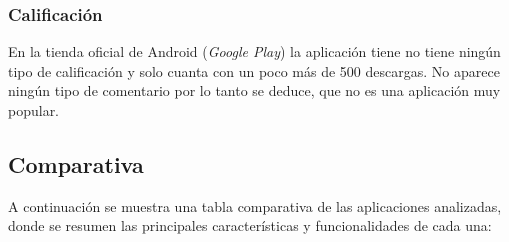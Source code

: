 \subsubsection{Calificación}
\label{subsec:calificacion_ourhome}
En la tienda oficial de Android (\textit{Google Play}) la aplicación tiene no tiene ningún tipo de calificación y solo cuanta con un poco más de 500 descargas. 
No aparece ningún tipo de comentario por lo tanto se deduce, que no es una aplicación muy popular. 


\subsection{Comparativa}
\label{sec:comparativa}

A continuación se muestra una tabla comparativa de las aplicaciones analizadas, donde se resumen las principales características y funcionalidades de cada una: 

\begin{table}[ht]
    \centering
    \renewcommand{\arraystretch}{1.3} 
    \caption{Comparativa de aplicaciones para la gestión de tareas y gastos.}
    \label{comparativa}
\end{table}

